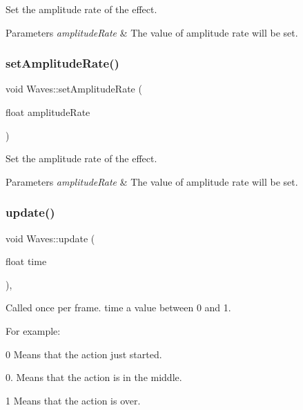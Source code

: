 Set the amplitude rate of the effect. 


\begin{DoxyParams}{Parameters}
{\em amplitude\+Rate} & The value of amplitude rate will be set. \\
\hline
\end{DoxyParams}
\mbox{\label{classWaves_abe89b564eea8d77f5e008218bcb48ccb}} 
\subsubsection{\texorpdfstring{set\+Amplitude\+Rate()}{setAmplitudeRate()}\hspace{0.1cm}{\footnotesize\ttfamily [2/2]}}
{\footnotesize\ttfamily void Waves\+::set\+Amplitude\+Rate (\begin{DoxyParamCaption}\item[{float}]{amplitude\+Rate }\end{DoxyParamCaption})\hspace{0.3cm}{\ttfamily [inline]}}



Set the amplitude rate of the effect. 


\begin{DoxyParams}{Parameters}
{\em amplitude\+Rate} & The value of amplitude rate will be set. \\
\hline
\end{DoxyParams}
\mbox{\label{classWaves_aa08ec978ee072d46a94068504cc997e8}} 
\subsubsection{\texorpdfstring{update()}{update()}\hspace{0.1cm}{\footnotesize\ttfamily [1/2]}}
{\footnotesize\ttfamily void Waves\+::update (\begin{DoxyParamCaption}\item[{float}]{time }\end{DoxyParamCaption})\hspace{0.3cm}{\ttfamily [override]}, {\ttfamily [virtual]}}

Called once per frame. time a value between 0 and 1.

For example\+:
\begin{DoxyItemize}
\item 0 Means that the action just started.
\item 0. Means that the action is in the middle.
\item 1 Means that the action is over.
\end{DoxyItemize}


